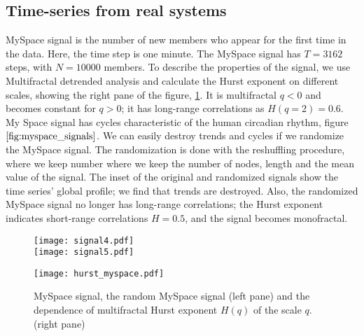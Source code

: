 \subsection{Time-series from real systems}

MySpace signal is the number of new members who appear for the first time in the data. Here, the time step is one minute. The MySpace signal has $T = 3162$ steps, with  $N = 10000$ members. To describe the properties of the signal, we use Multifractal detrended analysis and calculate the Hurst exponent on different scales, showing the right pane of the figure, \ref{fig:myspace_signals}. It is multifractal $q<0$ and becomes constant for $q>0$; it has long-range correlations as $H(q=2)=0.6$. My Space signal has cycles characteristic of the human circadian rhythm, figure $\ref{fig:myspace_signals}$. We can easily destroy trends and cycles if we randomize the MySpace signal. The randomization is done with the reshuffling procedure, where we keep number where we keep the number of nodes, length and the mean value of the signal. The inset of the original and randomized signals show the time series' global profile; we find that trends are destroyed. Also, the randomized MySpace signal no longer has long-range correlations; the Hurst exponent indicates short-range correlations $H=0.5$, and the signal becomes monofractal.    


\begin{figure}[H]
	\centering
	\begin{minipage}[b]{0.4\textwidth}
		\centering
		\texttt{[image: signal4.pdf]}\\
		\texttt{[image: signal5.pdf]}
	\end{minipage}
	\begin{minipage}[b]{0.45\textwidth}
		\centering
		\texttt{[image: hurst\_myspace.pdf]}
		\vspace{0.01cm}
	\end{minipage}
	\caption[Properties of MySpace signal.]{MySpace signal, the random MySpace signal (left pane) and the dependence of multifractal Hurst exponent $H(q)$ of the scale $q$. (right pane)}
	\label{fig:myspace_signals}
\end{figure}

